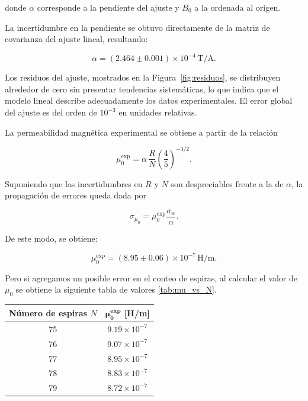 \documentclass{article}
\begin{document}
donde $\alpha$ corresponde a la pendiente del ajuste y $B_0$ a la ordenada al origen.

La incertidumbre en la pendiente se obtuvo directamente de la matriz de covarianza del ajuste
lineal, resultando:

\begin{equation}
\alpha = (2.464 \pm 0.001)\times 10^{-4}\,\text{T/A}.
\end{equation}

Los residuos del ajuste, mostrados en la Figura~\ref{fig:residuos}, se distribuyen alrededor
de cero sin presentar tendencias sistemáticas, lo que indica que el modelo lineal describe
adecuadamente los datos experimentales. El error global del ajuste es del orden de $10^{-3}$
en unidades relativas.

La permeabilidad magnética experimental se obtiene a partir de la relación

\begin{equation}
\mu_0^{\text{exp}} = \alpha\,\frac{R}{N}\left(\frac{4}{5}\right)^{-3/2}.
\end{equation}

Suponiendo que las incertidumbres en $R$ y $N$ son despreciables frente a la de $\alpha$, la
propagación de errores queda dada por

\begin{equation}
\sigma_{\mu_0} = \mu_0^{\text{exp}} \frac{\sigma_\alpha}{\alpha}.
\end{equation}

De este modo, se obtiene:

\begin{equation}
\mu_0^{\text{exp}} = (8.95 \pm 0.06)\times 10^{-7}\,\text{H/m}.
\end{equation}

Pero si agregamos un posible error en el conteo de espiras, al calcular el valor de $\mu_0$
se obtiene la siguiente tabla de valores \ref{tab:mu_vs_N}.

\begin{center}
\small
\begin{tabular}{|c|c|}
\hline
\textbf{Número de espiras $N$} & $\boldsymbol{\mu_0^{\text{exp}}}$ \textbf{[H/m]} \\ \hline
75 & $9.19 \times 10^{-7}$ \\ \hline
76 & $9.07 \times 10^{-7}$ \\ \hline
77 & $8.95 \times 10^{-7}$ \\ \hline
78 & $8.83 \times 10^{-7}$ \\ \hline
79 & $8.72 \times 10^{-7}$ \\ \hline
\end{tabular}
\label{tab:mu_vs_N}
\end{center}
\end{document}
